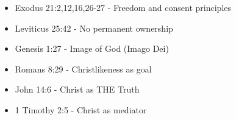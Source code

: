 \documentclass[12pt]{article}
\begin{document}
\begin{itemize}
    \item Exodus 21:2,12,16,26-27 - Freedom and consent principles
    \item Leviticus 25:42 - No permanent ownership
    \item Genesis 1:27 - Image of God (Imago Dei)
    \item Romans 8:29 - Christlikeness as goal
    \item John 14:6 - Christ as THE Truth
    \item 1 Timothy 2:5 - Christ as mediator
\end{itemize}
\end{document}
